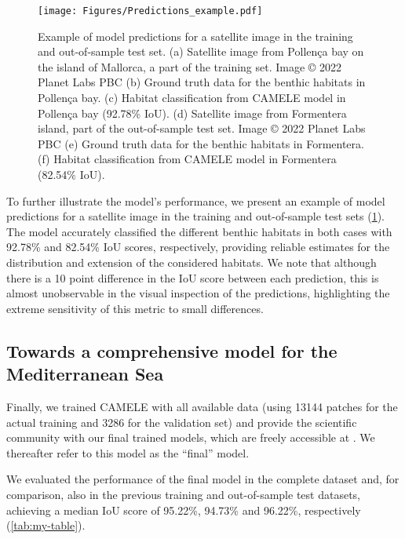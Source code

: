 \begin{figure}[H]
    \centering
    \texttt{[image: Figures/Predictions\_example.pdf]}
    \caption[Example of model predictions for a satellite image in the training
        and out-of-sample test set]{Example of model predictions for a
        satellite
        image in the training
        and out-of-sample test set. (a) Satellite image from Pollença bay on
        the island of Mallorca, a part of the training set. Image © 2022 Planet
        Labs PBC (b) Ground truth
        data for the benthic habitats in Pollença bay. (c) Habitat
        classification from CAMELE model in Pollença bay (92.78\% IoU). (d)
        Satellite image from Formentera island, part of the out-of-sample test
        set. Image © 2022 Planet
        Labs PBC (e) Ground truth data for the benthic habitats in Formentera.
        (f)
        Habitat classification from CAMELE model in Formentera (82.54\% IoU).}
    \label{fig:example_prediction}
\end{figure}

To further illustrate the model's performance, we present an example of model
predictions for a satellite image in the training and out-of-sample test sets
(\cref{fig:example_prediction}). The model accurately classified the different
benthic habitats in both cases with 92.78\% and 82.54\% IoU scores,
respectively, providing reliable estimates for the distribution and extension
of the considered habitats. We note that although there is a 10 point
difference in the IoU score between each prediction, this is almost
unobservable in the visual inspection of the predictions, highlighting the
extreme sensitivity of this metric to small differences.

\subsection{Towards a comprehensive model for the Mediterranean Sea}

Finally, we trained CAMELE with all available data (using 13144 patches for the
actual training and 3286 for the validation set) and provide the scientific
community with our final trained models, which are freely accessible at
\cite{GimenezRomero_zenodo}. We thereafter refer to this model as the ``final''
model.

We evaluated the performance of the final model in the
complete dataset and, for comparison, also in the previous training and
out-of-sample test datasets, achieving a median IoU score of 95.22\%, 94.73\%
and 96.22\%, respectively (\cref{tab:my-table}).

